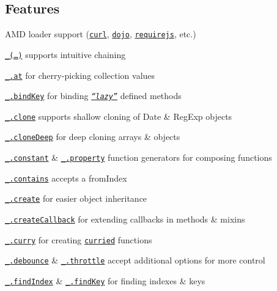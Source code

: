 \subsection*{Features}


\begin{DoxyItemize}
\item A\+MD loader support (\href{https://github.com/cujojs/curl}{\tt curl}, \href{http://dojotoolkit.org/}{\tt dojo}, \href{http://requirejs.org/}{\tt requirejs}, etc.)
\item \href{https://lodash.com/docs#_}{\tt \+\_\+(…)} supports intuitive chaining
\item \href{https://lodash.com/docs#at}{\tt \+\_\+.\+at} for cherry-\/picking collection values
\item \href{https://lodash.com/docs#bindKey}{\tt \+\_\+.\+bind\+Key} for binding \href{http://michaux.ca/articles/lazy-function-definition-pattern}{\tt {\itshape “lazy”}} defined methods
\item \href{https://lodash.com/docs#clone}{\tt \+\_\+.\+clone} supports shallow cloning of {\ttfamily Date} \& {\ttfamily Reg\+Exp} objects
\item \href{https://lodash.com/docs#cloneDeep}{\tt \+\_\+.\+clone\+Deep} for deep cloning arrays \& objects
\item \href{https://lodash.com/docs#constant}{\tt \+\_\+.\+constant} \& \href{https://lodash.com/docs#property}{\tt \+\_\+.\+property} function generators for composing functions
\item \href{https://lodash.com/docs#contains}{\tt \+\_\+.\+contains} accepts a {\ttfamily from\+Index}
\item \href{https://lodash.com/docs#create}{\tt \+\_\+.\+create} for easier object inheritance
\item \href{https://lodash.com/docs#createCallback}{\tt \+\_\+.\+create\+Callback} for extending callbacks in methods \& mixins
\item \href{https://lodash.com/docs#curry}{\tt \+\_\+.\+curry} for creating \href{http://hughfdjackson.com/javascript/2013/07/06/why-curry-helps/}{\tt curried} functions
\item \href{https://lodash.com/docs#debounce}{\tt \+\_\+.\+debounce} \& \href{https://lodash.com/docs#throttle}{\tt \+\_\+.\+throttle} accept additional {\ttfamily options} for more control
\item \href{https://lodash.com/docs#findIndex}{\tt \+\_\+.\+find\+Index} \& \href{https://lodash.com/docs#findKey}{\tt \+\_\+.\+find\+Key} for finding indexes \& keys

\end{DoxyItemize}
